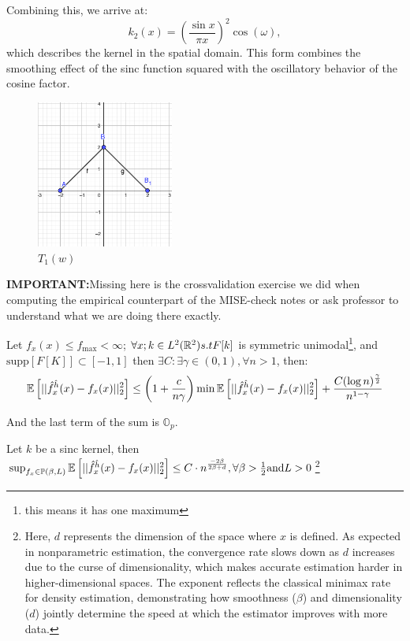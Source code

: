 \documentclass{article}
\begin{document}
\begin{remark}
    Combining this, we arrive at:
    \[
    k_2(x) = \left(\frac{\sin x}{\pi x}\right)^2 \cos(\omega),
    \]
    which describes the kernel in the spatial domain. This form combines the smoothing effect of the sinc function squared with the oscillatory behavior of the cosine factor.


    \begin{figure}[h]
        \centering
        \includegraphics[width=0.4\textwidth]{kernel_2_example.png} %
        \caption{$T_{1}(w)$}
        \label{fig:tradeoff}
    \end{figure}
    
\end{remark}

\textbf{IMPORTANT:}Missing here is the crossvalidation exercise we did when computing the empirical counterpart of the MISE-check notes or ask professor to understand what we are doing there exactly.


\begin{theorem}
    Let \(f_{x}(x)\leq f_{\text{max}}< \infty\); \(\forall x; k \in L^{2}(\mathbb{R}^{2}) s.t F[k]\) is symmetric unimodal\footnote{this means it has one maximum}, and \(\text{supp}[F[K]]\subset [-1,1]\) then \(\exists C: \exists \gamma \in (0,1), \forall n>1\), then: \[
    \mathbb{E}\left[||\hat{f}^{\hat{h}}_{x}(x)- f_{x}(x)||^{2}_{2}\right] \leq \left(1+ \frac{c}{n\gamma}\right) \min \mathbb{E} \left[||\hat{f}^{\hat{h}}_{x}(x)- f_{x}(x)||^{2}_{2}\right]+ \frac{C(\log n)^{\frac{\gamma}{2}}}{n^{1-\gamma}}
    \]

    And the last term of the sum is \(\mathbb{O}_p\).
\end{theorem}


\begin{corollary}
    Let $k$ be a sinc kernel, then \(\sup_{f_ {x}\in \mathbb{P}(\beta, L)}\mathbb{E}\left[||\hat{f}^{\hat{h}}_{x}(x)- f_{x}(x)||^{2}_{2}\right] \leq C \cdot n^{\frac{-2\beta}{2\beta + d}}, \forall \beta > \frac{1}{2} \text{and} L>0\)\footnote{Here, \( d \) represents the dimension of the space where \( x \) is defined. As expected in nonparametric estimation, the convergence rate slows down as \( d \) increases due to the curse of dimensionality, which makes accurate estimation harder in higher-dimensional spaces. The exponent reflects the classical minimax rate for density estimation, demonstrating how smoothness (\(\beta\)) and dimensionality (\(d\)) jointly determine the speed at which the estimator improves with more data.}

\end{corollary}
\end{document}

